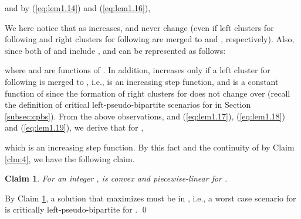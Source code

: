 \documentclass[a4paper]{llncs}
\newtheorem{clm}{Claim}
\begin{document}
and by (\ref{eq:lem1.14}) and (\ref{eq:lem1.16}),

We here notice that as  increases,  and  never change (even if left clusters for  following  and right clusters for  following  are merged to  and , respectively).
Also, since both of  and  include , 
 and  can be represented as follows:

where  and  are functions of .
In addition,  increases only if a left cluster for  following  is merged to , 
i.e.,  is an increasing step function,
and  is a constant function of  since the formation of right clusters for  does not change over 
(recall the definition of critical left-pseudo-bipartite scenarios for  in Section \ref{subsec:cpbs}).
From the above observations, and (\ref{eq:lem1.17}), (\ref{eq:lem1.18}) and (\ref{eq:lem1.19}), we derive that for ,

which is an increasing step function.
By this fact and the continuity of  by Claim \ref{clm:4}, we have the following claim.
\begin{clm}
For an integer ,  is convex and piecewise-linear for .
\label{clm:5}
\end{clm}

By Claim \ref{clm:5}, a solution that maximizes  must be in ,
i.e., a worst case scenario for  is critically left-pseudo-bipartite for .
\qed
\end{document}
